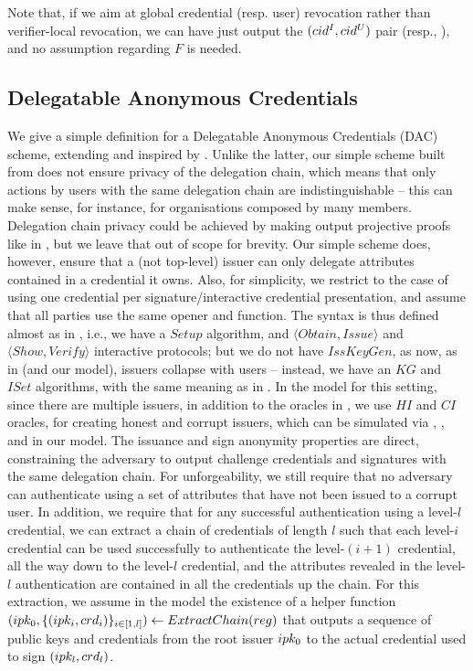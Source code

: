 Note that, if we aim at global credential (resp. user) revocation rather than
verifier-local revocation, we can have \finsp just output the $(cid^I,cid^U)$
pair (resp., \upk), and no assumption regarding $F$ is needed.

\subsection{Delegatable Anonymous Credentials}
\label{sapp:related-models-dac}

We give a simple definition for a Delegatable Anonymous Credentials (DAC)
scheme, extending \cite{fhs19} and inspired by \cite{bcc+09}. Unlike the latter,
our simple scheme built from \CUASGenInt does not ensure privacy of the
delegation chain, which means that only actions by users with the same
delegation chain are indistinguishable -- this can make sense, for instance,
for organisations composed by many members. Delegation chain privacy could be
achieved by making \feval output projective proofs like in \cite{bcc+09}, but we
leave that out of scope for brevity. Our simple scheme
does, however, ensure that a (not top-level) issuer can only delegate attributes
contained in a credential it owns. Also, for simplicity, we restrict to the case
of using one credential per signature/interactive credential presentation, and
assume that all parties use the same opener and \finsp function.
%
The syntax is thus defined almost as in ,
i.e., we have a $Setup$ algorithm, and $\langle Obtain,Issue\rangle$
and $\langle Show,Verify \rangle$ interactive protocols; but we do not have
$IssKeyGen$, as now, as in \cite{bcc+09} (and our \UAS model), issuers collapse
with users -- instead, we have an $KG$ and $ISet$ algorithms, with the same
meaning as in \UAS.
%
In the model for this setting, since there are multiple issuers, in addition
to the oracles in , we use $HI$ and $CI$ oracles,
for creating honest and corrupt issuers, which can be simulated via \HUGEN,
\CUGEN, \ISET and \ICORR in our \UAS model.
%
The issuance and sign anonymity properties are direct, constraining the
adversary to output challenge credentials and signatures with the same
delegation chain. For unforgeability, we still require that no adversary can
authenticate using a set of attributes that have not been issued to a corrupt
user. In addition, we require that for any successful authentication using a
level-$l$ credential, we can extract a chain of credentials of length $l$ such
that each level-$i$ credential can be used successfully to authenticate the
level-$(i+1)$ credential, all the way down to the level-$l$ credential, and the
attributes revealed in the level-$l$ authentication are contained in all the
credentials up the chain. For this extraction, we assume in the model the
existence of a helper function $(ipk_0,\lbrace (ipk_i,crd_i)
\rbrace_{i\in[1,l]}) \gets ExtractChain(reg)$ that outputs a sequence of
public keys and credentials from the root issuer $ipk_0$ to the actual
credential used to sign $(ipk_l,crd_l)$.

